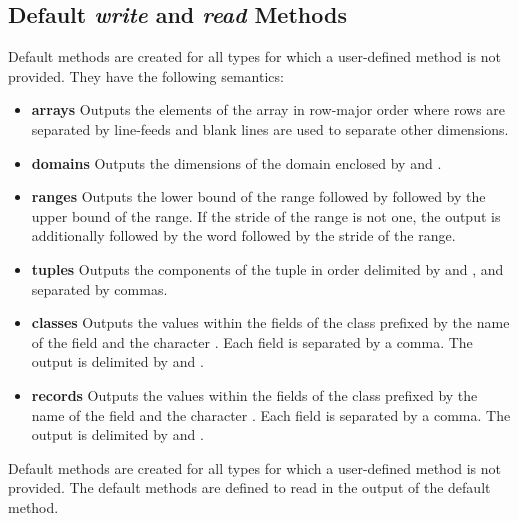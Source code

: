 



\subsection{Default {\em write} and {\em read} Methods}



Default  methods are created for all types for which a user-defined
 method is not provided.  They have the following semantics:
\begin{itemize}
\item
{\bf arrays} Outputs the elements of the array in row-major order
where rows are separated by line-feeds and blank lines are used to
separate other dimensions.
\item
{\bf domains} Outputs the dimensions of the domain enclosed
by \chpl{[} and \chpl{]}.
\item
{\bf ranges} Outputs the lower bound of the range followed
by  followed by the upper bound of the range.  If the stride
of the range is not one, the output is additionally followed by the
word  followed by the stride of the range.
\item
{\bf tuples} Outputs the components of the tuple in order delimited
by \chpl{(} and \chpl{)}, and separated by commas.
\item
{\bf classes} Outputs the values within the fields of the class
prefixed by the name of the field and the character \chpl{=}.  Each
field is separated by a comma.  The output is delimited by \chpl{\{}
and \chpl{\}}.
\item
{\bf records} Outputs the values within the fields of the class
prefixed by the name of the field and the character \chpl{=}.  Each
field is separated by a comma.  The output is delimited by \chpl{(}
and \chpl{)}.
\end{itemize}

Default  methods are created for all types for which a user-defined
 method is not provided.  The default  methods are
defined to read in the output of the default  method.
